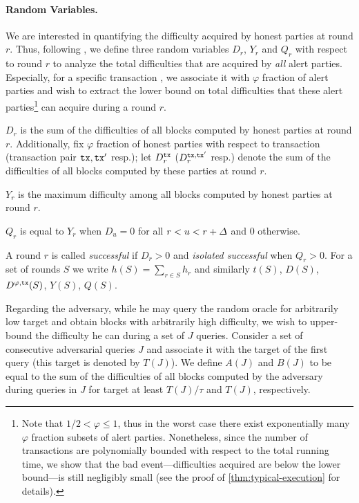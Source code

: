 \paragraph{Random Variables.}
%
We are interested in quantifying the difficulty acquired by honest parties at round $r$.
%
Thus, following \cite{EPRINT:GarKiaLeo20}, we define three random variables $D_r$, $Y_r$ and $Q_r$ with respect to round $r$ to analyze the total difficulties that are acquired by \emph{all} alert parties.
%
Especially, for a specific transaction \tx, we associate it with $\varphi$ fraction of alert parties and wish to extract the lower bound on total difficulties that these alert parties\footnote{Note that $1/2 < \varphi \le 1$, thus in the worst case there exist exponentially many $\varphi$ fraction subsets of alert parties. Nonetheless, since the number of transactions are polynomially bounded with respect to the total running time, we show that the bad event---difficulties acquired are below the lower bound---is still negligibly small (see the proof of \cref{thm:typical-execution} for details).} can acquire during a round $r$.

\begin{cccItemize}[noitemsep]
    \item $D_r$ is the sum of the difficulties of all blocks computed by honest parties at round $r$.
    Additionally, fix $\varphi$ fraction of honest parties with respect to transaction \tx (transaction pair $\mathtt{tx}, \mathtt{tx}'$ resp.); let $D^{\mathtt{tx}}_r$ ($D^{\mathtt{tx}, \mathtt{tx}'}_r$ resp.) denote the sum of the difficulties of all blocks computed by these parties at round $r$.
    \item $Y_r$ is the maximum difficulty among all blocks computed by honest parties at round $r$.
    \item $Q_r$ is equal to $Y_r$ when $D_u = 0$ for all $r < u < r + \varDelta$ and 0 otherwise.
\end{cccItemize}
%
A round $r$ is called \emph{successful} if $D_r > 0$ and \emph{isolated successful} when $Q_r > 0$.
%
For a set of rounds $S$ we write $h(S) = \sum_{r \in S} h_r$ and similarly $t(S)$, $D(S)$, $D^{\varphi, \mathtt{tx}}(S)$, $Y(S)$, $Q(S)$.

Regarding the adversary, while he may query the random oracle for arbitrarily low target and obtain blocks with arbitrarily high difficulty, we wish to upper-bound the difficulty he can during a set of $J$ queries.
%
Consider a set of consecutive adversarial queries $J$ and associate it with the target of the first query (this target is denoted by $T(J)$).
%
We define $A(J)$ and $B(J)$ to be equal to the sum of the difficulties of all blocks computed by the adversary during queries in $J$ for target at least $T(J) / \tau$ and $T(J)$, respectively.

